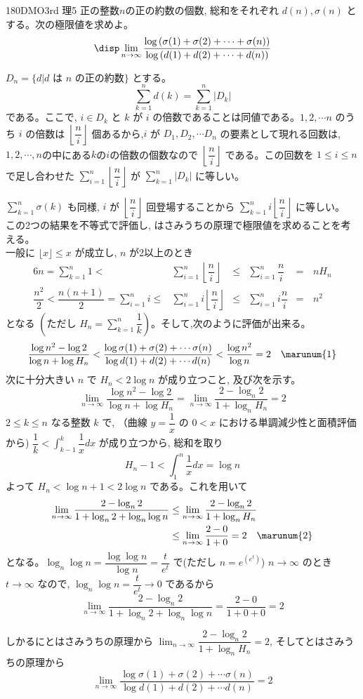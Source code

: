 \begin{prob}{180}{}{DMO3rd 理5}
 正の整数$n$の正の約数の個数, 総和をそれぞれ $d(n), \sigma (n)$ とする。次の極限値を求めよ。
 \[\disp\lim_{n\to \infty}\dfrac{\log{(\sigma(1) +\sigma(2) +\cdots +\sigma (n))}}{\log{(d(1)+d(2)+\cdots +d(n))}}\]
\end{prob}

$D_n=\{d| \mbox{$d$ は $n$ の正の約数}\}$ とする。
\[\displaystyle\sum_{k=1}^n d(k) = \displaystyle\sum_{k=1}^n|D_k|\] である。ここで, $i\in D_k$ と $k$ が $i$ の倍数であることは同値である。$1,2,\cdots n$ のうち $i$ の倍数は $\left\lfloor\dfrac{n}{i}\right\rfloor$ 個あるから,$i$ が $D_1, D_2, \cdots D_n$ の要素として現れる回数は, $1,2,\cdots, n$の中にある$k$の$i$の倍数の個数なので $\left\lfloor\dfrac{n}{i}\right\rfloor$ である。この回数を $1\le i\le n$ で足し合わせた $\displaystyle\sum_{i=1}^n \left\lfloor\dfrac{n}{i}\right\rfloor$ が $\displaystyle\sum_{k=1}^n |D_k|$ に等しい。

$\displaystyle\sum_{k=1}^n \sigma (k)$ も同様, $i$ が $\left\lfloor\dfrac{n}{i}\right\rfloor$ 回登場することから $\displaystyle\sum_{k=1}^n i\left\lfloor\dfrac{n}{i}\right\rfloor$ に等しい。 \\
この2つの結果を不等式で評価し, はさみうちの原理で極限値を求めることを考える。\\
一般に $\lfloor x\rfloor\le x$ が成立し, $n$ が2以上のとき
\begin{alignat*}{6}
n=\sum_{k=1}^n 1 < &\sum_{i=1}^n \left\lfloor\dfrac{n}{i}\right\rfloor& \le &\sum_{i=1}^n \dfrac{n}{i}& =&\,nH_n\\
\dfrac{n^2}{2}<\dfrac{n(n+1)}{2}=\sum_{i=1}^n i \le &\sum_{i=1}^n i\left\lfloor\dfrac{n}{i}\right\rfloor& \le &\sum_{i=1}^n i\dfrac{n}{i}& =&\,n^2
\end{alignat*}
となる $(\text{ただし}\,\,H_n=\displaystyle\sum_{k=1}^n\dfrac{1}{k})$。そして,次のように評価が出来る。
\begin{align*}
\dfrac{\log{n^2}-\log{2}}{\log{n}+\log{H_n}} < \dfrac{\log{\sigma(1) +\sigma (2)+\cdots \sigma (n)}}{\log{d(1)+d(2)+\cdots d(n)}} < \dfrac{\log{n^2}}{\log{n}} = 2 \quad \marunum{1}
\end{align*}
次に十分大きい $n$ で $H_n<2\log{n}$ が成り立つこと, 及び次を示す。
\[ \lim_{n\to\infty}\dfrac{\log{n^2}-\log{2}}{\log{n}+\log{H_n}}=\lim_{n\to\infty}\dfrac{2-\log_n{2}}{1+\log_n{H_n}}=2 \]
$2\le k\le n$ なる整数 $k$ で, （曲線 $y=\dfrac{1}{x}$ の $0<x$ における単調減少性と面積評価から) $\dfrac{1}{k}<\displaystyle\int_{k-1}^{k} \dfrac{1}{x} dx$ が成り立つから, 総和を取り
\[ H_n-1<\displaystyle\int_1^{n}\dfrac{1}{x} dx=\log{n} \]
よって $H_n<\log{n}+1<2\log{n}$ である。これを用いて
\begin{align*}
\lim_{n\to\infty}\dfrac{2-\log_n{2}}{1+\log_n{2}+\log_n{\log{n}}}&\le\lim_{n\to\infty}\dfrac{2-\log_n{2}}{1+\log_n{H_n}}\\
&\le\lim_{n\to\infty}\dfrac{2-0}{1+0}=2 \quad \marunum{2}
\end{align*}
となる。$\log_n{\log{n}}=\dfrac{\log{\log{n}}}{\log{n}}=\dfrac{t}{e^t}$ で(ただし $n= e^{(e^t)}$) $n\rightarrow \infty$ のとき $t\rightarrow \infty$ なので, $\log_n{\log{n}}=\dfrac{t}{e^t}\rightarrow 0$ であるから
\[ \lim_{n\to\infty}\dfrac{2-\log_n{2}}{1+\log_n{2}+\log_n{\log{n}}}=\dfrac{2-0}{1+0+0}=2 \]

しかるにとはさみうちの原理から $\displaystyle\lim_{n\to\infty}\dfrac{2-\log_n{2}}{1+\log_n{H_n}}=2$, そしてとはさみうちの原理から
\[\displaystyle\lim_{n\to\infty }\dfrac{\log{\sigma(1) +\sigma (2)+\cdots \sigma (n)}}{\log{d(1)+d(2)+\cdots d(n)}}=2\]
